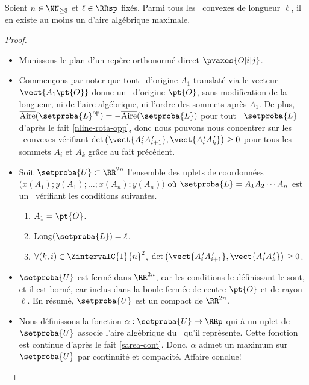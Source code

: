 

\newpage

\begin{fact} \label{at-least-one-ncycle}
    Soient $n \in \NN_{\geq3}$ et $\ell \in \RRsp$ fixés.
    Parmi tous les \ncycles\ convexes de longueur $\ell$, il en existe au moins un d'aire algébrique maximale.
\end{fact}


\begin{proof}
	\leavevmode
	\begin{itemize}
		\item Munissons le plan d'un repère orthonormé direct $\pvaxes{O | i | j}$.


        \item Commençons par noter que tout \ncycle\ d'origine $A_1$ translaté via le vecteur $\vect{A_1 \pt{O}}$ donne un \ncycle\ d'origine $\pt{O}$, sans modification de la longueur, ni de l'aire algébrique, ni l'ordre des sommets après $A_1$.
        De plus, $\sarea{\setproba{L}^{\mathrm{op}}} = - \sarea{\setproba{L}}$ pour tout \ncycle\ $\setproba{L}$ d'après le fait \ref{nline-rota-opp}, donc nous pouvons nous concentrer sur les \ncycles\ convexes vérifiant $\det \big( \vect{A^{\,\prime}_i A^{\,\prime}_{i+1}}, \vect{A^{\,\prime}_i A^{\,\prime}_k} \big) \geq 0$ pour tous les sommets $A_i$ et $A_k$ grâce au fait précédent.


        \item Soit $\setproba{U} \subset \RR^{2n}$ l'ensemble des uplets de coordonnées $\big( x(A_1) ; y(A_1) ; \dots ; x(A_n) ; y(A_n) \big)$ où $\setproba{L} = A_1 A_2 \cdots A_n$ est un \ncycle\ vérifiant les conditions suivantes.
	    \begin{enumerate}
	    	\item $A_1 = \pt{O}$.

	    	\item $\cyclelen{\setproba{L}} = \ell$.

		    \item
		    $\forall (k, i) \in \ZintervalC{1}{n}^2$,
		    $\det \big( \vect{A^{\,\prime}_i A^{\,\prime}_{i+1}}, \vect{A^{\,\prime}_i A^{\,\prime}_k} \big) \geq 0$.
	    \end{enumerate}


        \item $\setproba{U}$ est fermé dans $\RR^{2n}$, car les conditions le définissant le sont, et il est borné, car inclus dans la boule fermée de centre $\pt{O}$ et de rayon $\ell$.
        En résumé, $\setproba{U}$ est un compact de $\RR^{2n}$.


        \item Nous définissons la fonction $\alpha: \setproba{U} \rightarrow \RRp$ qui à un uplet de $\setproba{U}$ associe l'aire algébrique du \ncycle\ qu'il représente.
        Cette fonction est continue d'après le fait \ref{sarea-cont}.
        Donc, $\alpha$ admet un maximum sur $\setproba{U}$ par continuité et compacité. Affaire conclue!
    \end{itemize}
	
	\null\vspace{-6ex}
\end{proof}


